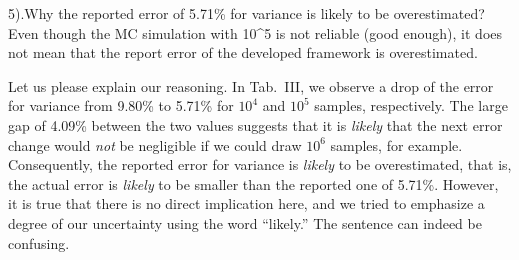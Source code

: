 \begin{reviewer}
5).Why the reported error of 5.71\% for variance is likely to be overestimated? Even though the MC simulation with 10\^{}5 is not reliable (good enough), it does not mean that the report error of the developed framework is overestimated.
\end{reviewer}
\begin{authors}
Let us please explain our reasoning.
In Tab.~III, we observe a drop of the error for variance from 9.80\% to 5.71\% for $10^4$ and $10^5$ samples, respectively.
The large gap of 4.09\% between the two values suggests that it is \emph{likely} that the next error change would \emph{not} be negligible if we could draw $10^6$ samples, for example.
Consequently, the reported error for variance is \emph{likely} to be overestimated, that is, the actual error is \emph{likely} to be smaller than the reported one of 5.71\%.
However, it is true that there is no direct implication here, and we tried to emphasize a degree of our uncertainty using the word ``likely.''
The sentence can indeed be confusing.

\end{authors}

